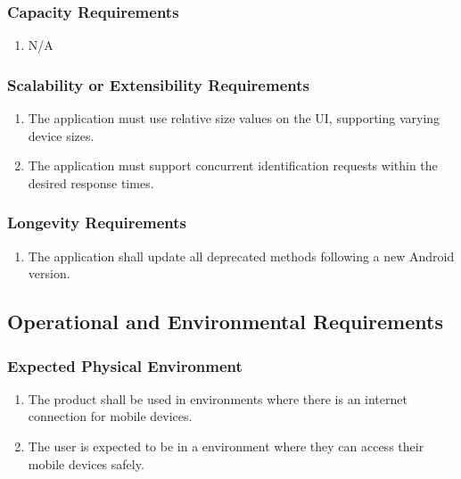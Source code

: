 \documentclass[12pt]{article}
\begin{document}
    \subsubsection{Capacity Requirements}
    \label{ssub:capacity_requirements}
    \begin{enumerate}[{PR-C}1. ]
        \item N/A
    \end{enumerate}
    
    \subsubsection{Scalability or Extensibility Requirements}
    \label{ssub:scalability_or_extensibility_requirements}
    \begin{enumerate}[{PR-SE}1. ]
        \item The application must use relative size values on the UI, supporting varying device sizes.
        \item The application must support concurrent identification requests within the desired response times.
    \end{enumerate}
    
    \subsubsection{Longevity Requirements}
    \label{ssub:longevity_requirements}
    \begin{enumerate}[{PR-L}1. ]
        \item The application shall update all deprecated methods following a new Android version.
    \end{enumerate}
    
    
    \subsection{Operational and Environmental Requirements}
    \label{sub:operational_and_environmental_requirements}
    
    \subsubsection{Expected Physical Environment}
    \label{ssub:expected_physical_environment}
    \begin{enumerate}[{OE-EPE}1. ]
        \item  The product shall be used in environments where there is an internet connection for mobile devices.
        \item The user is expected to be in a environment where they can access their mobile devices safely.
    \end{enumerate}
    
\end{document}
